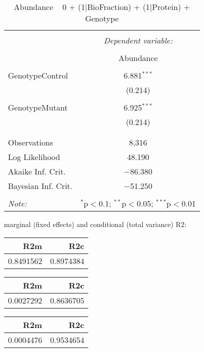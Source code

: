 \documentclass[11pt]{report}
\begin{document}
\begin{table}[!htbp] \centering 
  \caption{Abundance ~ 0 + (1|BioFraction) + (1|Protein) + Genotype} 
  \label{} 
\begin{tabular}{@{\extracolsep{5pt}}lc} 
\\[-1.8ex]\hline 
\hline \\[-1.8ex] 
 & \multicolumn{1}{c}{\textit{Dependent variable:}} \\ 
\cline{2-2} 
\\[-1.8ex] & Abundance \\ 
\hline \\[-1.8ex] 
 GenotypeControl & 6.881$^{***}$ \\ 
  & (0.214) \\ 
  & \\ 
 GenotypeMutant & 6.925$^{***}$ \\ 
  & (0.214) \\ 
  & \\ 
\hline \\[-1.8ex] 
Observations & 8,316 \\ 
Log Likelihood & 48.190 \\ 
Akaike Inf. Crit. & $-$86.380 \\ 
Bayesian Inf. Crit. & $-$51.250 \\ 
\hline 
\hline \\[-1.8ex] 
\textit{Note:}  & \multicolumn{1}{r}{$^{*}$p$<$0.1; $^{**}$p$<$0.05; $^{***}$p$<$0.01} \\ 
\end{tabular} 
\end{table} 
marginal (fixed effects) and conditional (total variance) R2:

\begin{tabular}{r|r}
\hline
R2m & R2c\\
\hline
0.8491562 & 0.8974384\\
\hline
\end{tabular}

\begin{tabular}{r|r}
\hline
R2m & R2c\\
\hline
0.0027292 & 0.8636705\\
\hline
\end{tabular}

\begin{tabular}{r|r}
\hline
R2m & R2c\\
\hline
0.0004476 & 0.9534654\\
\hline
\end{tabular}
\end{document}
